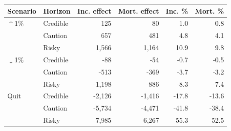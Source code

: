 \begingroup
\renewcommand{\arraystretch}{1.08}
\setlength{\tabcolsep}{4pt}
\begin{tabular}{llrrrr}
\toprule
Scenario & Horizon & Inc. effect & Mort. effect & Inc. \% & Mort. \% \\
\midrule
$\uparrow$1\% & Credible & 125 & 80 & 1.0 & 0.8 \\
 & Caution & 657 & 481 & 4.8 & 4.1 \\
 & Risky & 1,566 & 1,164 & 10.9 & 9.8 \\
\midrule
$\downarrow$1\% & Credible & -88 & -54 & -0.7 & -0.5 \\
 & Caution & -513 & -369 & -3.7 & -3.2 \\
 & Risky & -1,198 & -886 & -8.3 & -7.4 \\
\midrule
Quit & Credible & -2,126 & -1,416 & -17.8 & -13.6 \\
 & Caution & -5,734 & -4,471 & -41.8 & -38.4 \\
 & Risky & -7,985 & -6,267 & -55.3 & -52.5 \\
\bottomrule
\end{tabular}
\endgroup
